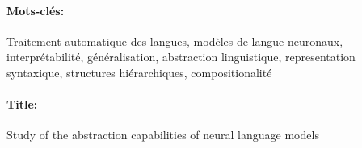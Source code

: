 \paragraph{Mots-clés:} Traitement automatique des langues, modèles de langue neuronaux, interprétabilité, généralisation, abstraction linguistique,  representation syntaxique, structures hiérarchiques, compositionalité 



\newpage

\paragraph{Title:} Study of the abstraction capabilities of neural language models

